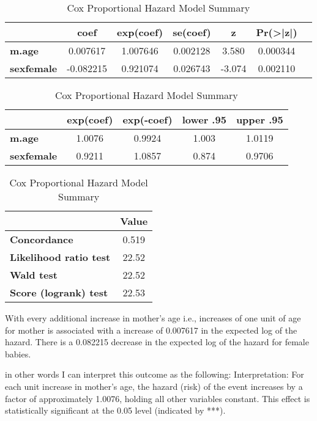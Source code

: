 \documentclass[12pt,letterpaper]{article}
\begin{document}
	
	\begin{table}[htbp]
		\centering
		\caption{Cox Proportional Hazard Model Summary}
		\label{tab:cox_model_summary}
		\begin{tabular}{lcccccc}
			\toprule
			& \textbf{coef} & \textbf{exp(coef)} & \textbf{se(coef)} & \textbf{z} & \textbf{Pr(\textgreater |z|)} \\
			\midrule
			\textbf{m.age} & 0.007617 & 1.007646 & 0.002128 & 3.580 & 0.000344 \\
			\textbf{sexfemale} & -0.082215 & 0.921074 & 0.026743 & -3.074 & 0.002110 \\
			\bottomrule
		\end{tabular}
		\vspace{0.5cm}
		
		\begin{tabular}{lcccc}
			\toprule
			& \textbf{exp(coef)} & \textbf{exp(-coef)} & \textbf{lower .95} & \textbf{upper .95} \\
			\midrule
			\textbf{m.age} & 1.0076 & 0.9924 & 1.003 & 1.0119 \\
			\textbf{sexfemale} & 0.9211 & 1.0857 & 0.874 & 0.9706 \\
			\bottomrule
		\end{tabular}
		\vspace{0.5cm}
		
		\begin{tabular}{lc}
			\toprule
			& \textbf{Value} \\
			\midrule
			\textbf{Concordance} & 0.519 \\
			\textbf{Likelihood ratio test} & 22.52 \\
			\textbf{Wald test} & 22.52 \\
			\textbf{Score (logrank) test} & 22.53 \\
			\bottomrule
		\end{tabular}
	\end{table}
	With every additional increase in mother's age i.e., increases of one unit of age for mother is associated with a increase of 0.007617 in the expected log of the hazard. There is a 0.082215  decrease in the expected log of the hazard for female babies.
	
	in other words I can interpret this outcome as the following: Interpretation: For each unit increase in mother's age, the hazard (risk) of the event increases by a factor of approximately 1.0076, holding all other variables constant. This effect is statistically significant at the 0.05 level (indicated by ***).
	
\end{document}
